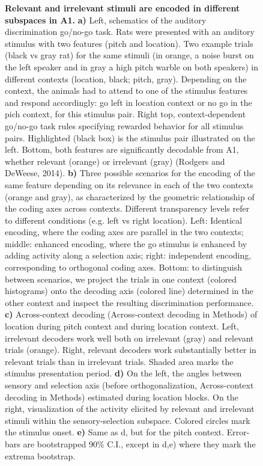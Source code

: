 \documentclass[12pt]{article}
\begin{document}
\begin{figure}
    \caption{\textbf{Relevant and irrelevant stimuli are encoded in different subspaces in A1.} \textbf{a)} Left, schematics of the auditory discrimination go/no-go task. Rats were presented with an auditory stimulus with two features (pitch and location). Two example trials (black vs gray rat) for the same stimuli (in orange, a noise burst on the left speaker and in gray a high pitch warble on both speakers) in different contexts (location, black; pitch, gray). Depending on the context, the animals had to attend to one of the stimulus features and respond accordingly: go left in location context or no go in the pich context, for this stimulus pair. Right top, context-dependent go/no-go task rules specifying rewarded behavior for all stimulus pairs. Highlighted (black box) is the stimulus pair illustrated on the left. Bottom, both features are significantly decodable from A1, whether relevant (orange) or irrelevant (gray)  (Rodgers and DeWeese, 2014). \textbf{b)} Three possible scenarios for the encoding of the same feature depending on its relevance in each of the two contexts (orange and gray), as characterized by the geometric relationship of the coding axes across contexts. Different transparency levels refer to different conditions (e.g. left vs right location). Left: Identical encoding, where the coding axes are parallel in the two contexts; middle: enhanced encoding, where the go stimulus is enhanced by adding activity along a selection axis; right: independent encoding, corresponding to orthogonal coding axes. Bottom: to distinguish between scenarios, we project the trials in one context (colored histograms) onto the decoding axis (colored line) determined in the other context and inspect the resulting discrimination performance. \textbf{c)} Across-context decoding (Across-context decoding in Methods) of location during pitch context and during location context. Left, irrelevant decoders work well both on irrelevant (gray) and relevant trials (orange). Right, relevant decoders work substantially better in relevant trials than in irrelevant trials. Shaded area marks the stimulus presentation period. \textbf{d)} On the left, the angles between sensory and selection axis (before orthogonalization, Across-context decoding in Methods) estimated during location blocks. On the right, visualization of the activity elicited by relevant and irrelevant stimuli within the sensory-selection subspace. Colored circles mark the stimulus onset. \textbf{e)} Same as d, but for the pitch context. Error-bars are bootstrapped 90\% C.I., except in d,e) where they mark the extrema bootstrap.} 
    \label{fig1}
\end{figure}
\end{document}
